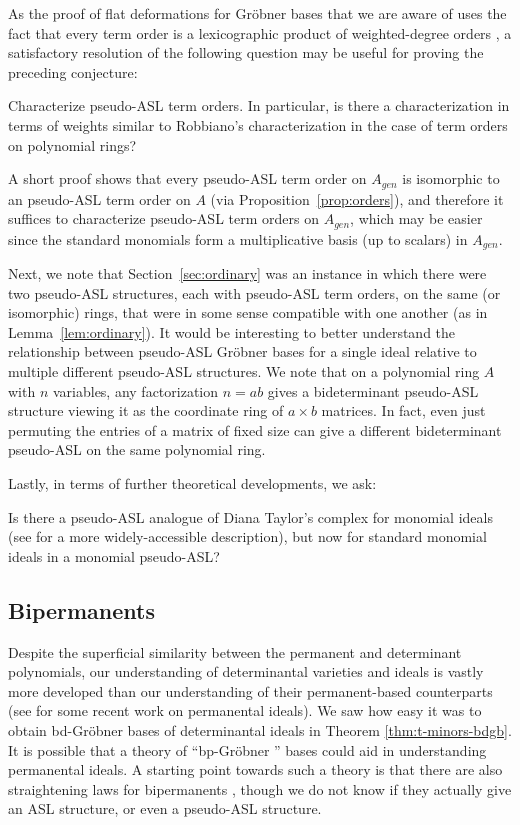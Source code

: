 \documentclass[11pt,reqno]{amsart}
\newcommand{\gb}{Gr\"{o}bner }
\theoremstyle{definition}
\numberwithin{equation}{section}
\begin{document}
As the proof of flat deformations for Gröbner bases that we are aware of uses the fact that every term order is a lexicographic product of weighted-degree orders \cite{robbianoTermOrder}, a satisfactory resolution of the following question may be useful for proving the preceding conjecture:

\begin{open} \label{q:orders}
Characterize pseudo-ASL term orders. In particular, is there a characterization in terms of weights similar to Robbiano's characterization \cite{robbianoTermOrder} in the case of term orders on polynomial rings?
\end{open}

A short proof shows that every pseudo-ASL term order on $A_{gen}$ is isomorphic to an pseudo-ASL term order on $A$ (via Proposition~\ref{prop:orders}), and therefore it suffices to characterize pseudo-ASL term orders on $A_{gen}$, which may be easier since the standard monomials form a multiplicative basis (up to scalars) in $A_{gen}$.

Next, we note that Section~\ref{sec:ordinary} was an instance in which there were two pseudo-ASL structures, each with pseudo-ASL term orders, on the same (or isomorphic) rings, that were in some sense compatible with one another (as in Lemma~\ref{lem:ordinary}). It would be interesting to better understand the relationship between pseudo-ASL Gröbner bases for a single ideal relative to multiple different pseudo-ASL structures. We note that on a polynomial ring $A$ with $n$ variables, any factorization $n=ab$ gives a bideterminant pseudo-ASL structure viewing it as the coordinate ring of $a \times b$ matrices. In fact, even just permuting the entries of a matrix of fixed size can give a different bideterminant pseudo-ASL on the same polynomial ring.

Lastly, in terms of further theoretical developments, we ask:

\begin{open}
Is there a pseudo-ASL analogue of Diana Taylor's complex for monomial ideals \cite{taylor} (see \cite[Ex.~17.11]{eisenbud} for a more widely-accessible description), but now for standard monomial ideals in a monomial pseudo-ASL?
\end{open}

\subsection{Bipermanents}

Despite the superficial similarity between the permanent and determinant polynomials, our understanding of determinantal varieties and ideals is vastly more developed than our understanding of their permanent-based counterparts (see \cite{gesmundoperm,BORALEVI2025110079} for some recent work on permanental ideals). We saw how easy it was to obtain bd-\gb bases of determinantal ideals in Theorem \ref{thm:t-minors-bdgb}. It is possible that a theory of ``bp-\gb'' bases could aid in understanding permanental ideals. A starting point towards such a theory is that there are also straightening laws for bipermanents \cite{clausen,allen}, though we do not know if they actually give an ASL structure, or even a pseudo-ASL structure. 
\end{document}
